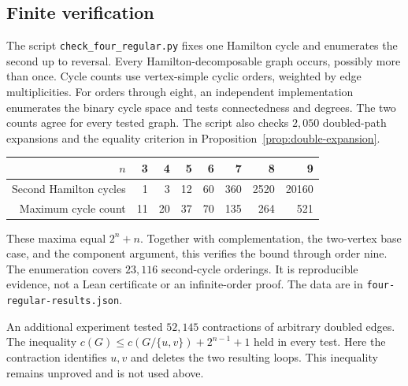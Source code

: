 \subsection{Finite verification}

The script \texttt{check\_four\_regular.py} fixes one Hamilton cycle and enumerates the second up to reversal.
Every Hamilton-decomposable graph occurs, possibly more than once.
Cycle counts use vertex-simple cyclic orders, weighted by edge multiplicities.
For orders through eight, an independent implementation enumerates the binary cycle space and tests connectedness and degrees.
The two counts agree for every tested graph.
The script also checks $2{,}050$ doubled-path expansions and the equality criterion in Proposition~\ref{prop:double-expansion}.

\begin{center}
\begin{tabular}{r|rrrrrrr}
$n$&3&4&5&6&7&8&9\\\hline
Second Hamilton cycles&1&3&12&60&360&2520&20160\\
Maximum cycle count&11&20&37&70&135&264&521
\end{tabular}
\end{center}

These maxima equal $2^n+n$.
Together with complementation, the two-vertex base case, and the component argument, this verifies the bound through order nine.
The enumeration covers $23{,}116$ second-cycle orderings.
It is reproducible evidence, not a Lean certificate or an infinite-order proof.
The data are in \texttt{four-regular-results.json}.

An additional experiment tested $52{,}145$ contractions of arbitrary doubled edges.
The inequality $c(G)\le c(G/\{u,v\})+2^{n-1}+1$ held in every test.
Here the contraction identifies $u,v$ and deletes the two resulting loops.
This inequality remains unproved and is not used above.
